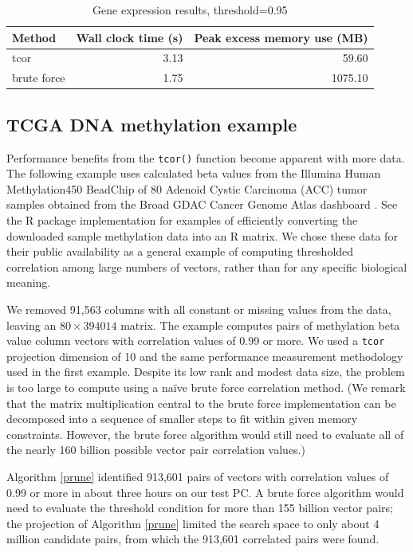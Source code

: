 \documentclass{article}
\let\proglang=\textsf
\numberwithin{algorithmctr}{section}
\begin{document}
\begin{table}[ht]
\centering
{\small
\begin{tabular}{lrr}
  \hline
Method & Wall clock time (s) & Peak excess memory use (MB) \\ 
  \hline
tcor & 3.13 & 59.60 \\ 
  brute force & 1.75 & 1075.10 \\ 
   \hline
\end{tabular}
}
\caption{Gene expression results, threshold=0.95} 
\label{EisenYeast}
\end{table}


\subsection{TCGA DNA methylation example}

Performance benefits from the {\tt tcor()} function become apparent with more
data.  The following example uses calculated beta values from the Illumina
Human Methylation450 BeadChip of 80 Adenoid Cystic Carcinoma (ACC) tumor
samples obtained from the Broad GDAC Cancer Genome Atlas dashboard \cite{gdac}.
See the \proglang{R} package implementation \cite{sup} for examples of
efficiently converting the downloaded sample methylation data into an R matrix.
We chose these data for their public availability as a general example of
computing thresholded correlation among large numbers of vectors,
rather than for any specific biological meaning.

We removed 91,563 columns with all constant or missing values from the data,
leaving an $80\times 394014$ matrix. The example computes pairs of methylation
beta value column vectors with correlation values of 0.99 or more. We used a
{\tt tcor} projection dimension of 10 and the same performance measurement
methodology used in the first example. Despite its low rank and modest data
size, the problem is too large to compute using a na\"ive brute force
correlation method.  (We remark that the matrix multiplication central to the
brute force implementation can be decomposed into a sequence of smaller steps
to fit within given memory constraints. However, the brute force algorithm
would still need to evaluate all of the nearly 160 billion possible vector pair
correlation values.)

Algorithm \ref{prune} identified 913,601 pairs of vectors with correlation
values of 0.99 or more in about three hours on our test PC. A brute force
algorithm would need to evaluate the threshold condition for more than 155
billion vector pairs; the projection of Algorithm \ref{prune} limited the
search space to only about 4 million candidate pairs, from which the 913,601
correlated pairs were found.
\end{document}
